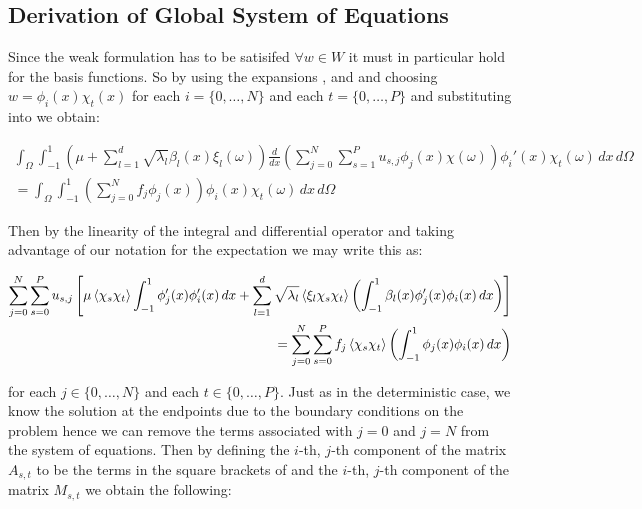 \subsection{Derivation of Global System of Equations}

Since the weak formulation  has to be satisifed
$\forall w \in W$ it must in particular hold for the basis functions. So by
using the expansions ,
 and  and
choosing $w = \phi_i(x)\chi_t(x)$ for each $i = \{0,\ldots,N\}$ and each $t =
\{0,\ldots,P\}$ and substituting into  we
obtain:

\begin{align*}
    \int_{\Omega}\int_{-1}^1
      \left(\mu + \sum_{l=1}^d\sqrt{\lambda_l}\beta_l(x)\xi_l(\omega)\right)
      \frac{d}{dx}\left(\sum_{j=0}^N\sum_{s=1}^Pu_{s,j}\phi_j(x)\chi(\omega)\right)
      \phi_i'(x)\chi_t(\omega)\, dx\, d\Omega \\ =
    \int_{\Omega}\int_{-1}^1
      \left(\sum_{j=0}^Nf_j\phi_j(x)\right)
      \phi_i(x)\chi_t(\omega)\, dx\, d\Omega
\end{align*}

Then by the linearity of the integral and differential operator and taking
advantage of our notation for the expectation
 we may write this as:

\begin{align}\label{eq:oned-stochastic-discrete}
  \begin{split}
      \sum_{j=0}^N\sum_{s=0}^Pu_{s,j}\left[
          \mu\left\langle\chi_s\chi_t\right\rangle
          \int_{-1}^1\phi_j'(x)\phi_i'(x)\, dx +
          \sum_{l=1}^d\sqrt{\lambda_l}\left\langle\xi_l\chi_s\chi_t\right\rangle
          \left(\int_{-1}^1 \beta_l(x)\phi_j'(x)\phi_i(x)\, dx\right)
      \right]\\ =
      \sum_{j=0}^N\sum_{s=0}^Pf_j\left\langle\chi_s\chi_t\right\rangle
          \left(\int_{-1}^1\phi_j(x)\phi_i(x)\, dx\right)
  \end{split}
\end{align}

for each $j \in \{0,\ldots,N\}$ and each $t \in \{0,\ldots,P\}$. Just as in
the deterministic case, we know the solution at the endpoints due to the
boundary conditions on the problem  hence we can
remove the terms associated with $j = 0$ and $j = N$ from the system of
equations. Then by defining the $i$-th, $j$-th component of the matrix
$A_{s,t}$ to be the terms in the square brackets of
 and the $i$-th, $j$-th component of the
matrix $M_{s,t}$ we obtain the following:

